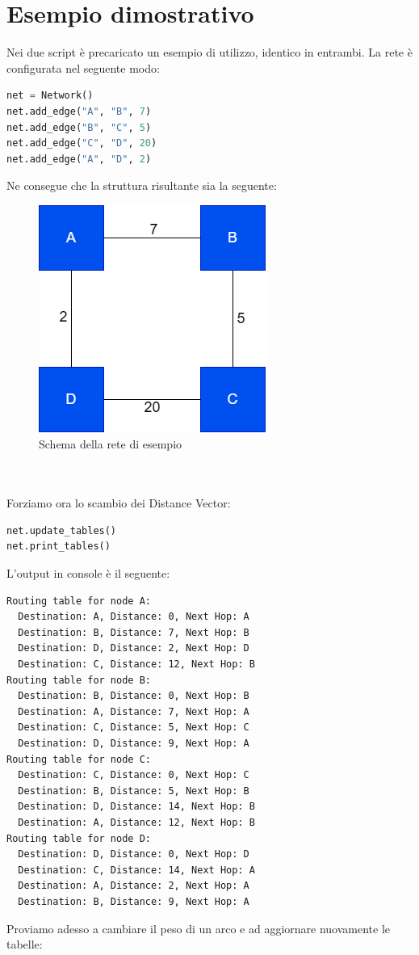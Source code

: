 \documentclass{report}
\begin{document}
\section{Esempio dimostrativo}
Nei due script è precaricato un esempio di utilizzo, identico in entrambi. La rete è configurata nel seguente modo:
\begin{lstlisting}[language=Python]
net = Network()
net.add_edge("A", "B", 7)
net.add_edge("B", "C", 5)
net.add_edge("C", "D", 20)
net.add_edge("A", "D", 2)
\end{lstlisting}
Ne consegue che la struttura risultante sia la seguente:
\begin{figure}
{
    \centering
    \includegraphics[width=0.3\linewidth]{DV-routing-example.png}
    \caption{Schema della rete di esempio}
    \label{fig:enter-label}
    }
\end{figure}
\\\\Forziamo ora lo scambio dei Distance Vector:
\begin{lstlisting}[language=Python]
net.update_tables()
net.print_tables()
\end{lstlisting}
L'output in console è il seguente:
\begin{lstlisting}[numbers=none]
Routing table for node A:
  Destination: A, Distance: 0, Next Hop: A
  Destination: B, Distance: 7, Next Hop: B
  Destination: D, Distance: 2, Next Hop: D
  Destination: C, Distance: 12, Next Hop: B
Routing table for node B:
  Destination: B, Distance: 0, Next Hop: B
  Destination: A, Distance: 7, Next Hop: A
  Destination: C, Distance: 5, Next Hop: C
  Destination: D, Distance: 9, Next Hop: A
Routing table for node C:
  Destination: C, Distance: 0, Next Hop: C
  Destination: B, Distance: 5, Next Hop: B
  Destination: D, Distance: 14, Next Hop: B
  Destination: A, Distance: 12, Next Hop: B
Routing table for node D:
  Destination: D, Distance: 0, Next Hop: D
  Destination: C, Distance: 14, Next Hop: A
  Destination: A, Distance: 2, Next Hop: A
  Destination: B, Distance: 9, Next Hop: A
\end{lstlisting}
Proviamo adesso a cambiare il peso di un arco e ad aggiornare nuovamente le tabelle:
\end{document}
